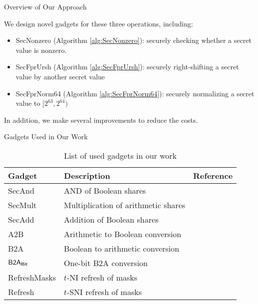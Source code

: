 \begin{frame}{Overview of Our Approach}

We design novel gadgets for these three operations, including:
\pause
\begin{itemize}
	\item {\sf SecNonzero} (Algorithm \ref{alg:SecNonzero}): securely checking whether a secret value is nonzero.
	\pause
	\item {\sf SecFprUrsh} (Algorithm \ref{alg:SecFprUrsh}): securely right-shifting a secret value by another secret value
	\pause
	\item {\sf SecFprNorm64} (Algorithm \ref{alg:SecFprNorm64}): securely normalizing a secret value to $[2^{63}, 2^{64})$
\end{itemize}
\pause
In addition, we make several improvements to reduce the costs.

\end{frame}


\begin{frame}{Gadgets Used in Our Work}

\begin{table}
\centering
\begin{tabular}{ l l l} 
\toprule
\textbf{Gadget} & \textbf{Description} & \textbf{Reference} \\
\midrule
\sf SecAnd & AND of Boolean shares & \cite{C:IshSahWag03, CCS:BBDFGS16} \\
{\sf SecMult} & Multiplication of arithmetic shares & \cite{C:IshSahWag03, CCS:BBDFGS16} \\
{\sf SecAdd} & Addition of Boolean shares & \cite{FSE:CGTV15, EC:BBEFGR18} \\
{\sf A2B} & Arithmetic to Boolean conversion & \cite{PKC:SPOG19} \\
{\sf B2A} & Boolean to arithmetic conversion & \cite{TCHES:BetCorZei18} \\
${\sf B2A_{Bit}}$ & One-bit {\sf B2A} conversion & \cite{PKC:SPOG19} \\
{\sf RefreshMasks} & $t$-NI refresh of masks & \cite{CCS:BBDFGS16, TCHES:BetCorZei18} \\
{\sf Refresh} & $t$-SNI refresh of masks & \cite{CCS:BBDFGS16} \\
\bottomrule
\end{tabular}
\caption{List of used gadgets in our work}
\label{table:gadgets}
\end{table}

\end{frame}